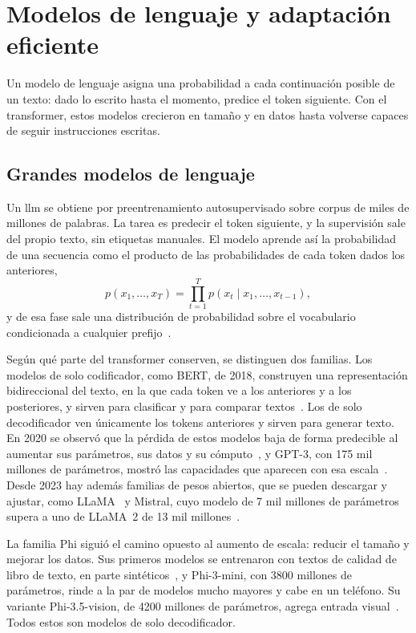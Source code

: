 \section{Modelos de lenguaje y adaptación eficiente}
\label{sec:marco_llm}

Un modelo de lenguaje asigna una probabilidad a cada continuación posible de un texto: dado lo escrito
hasta el momento, predice el token siguiente. Con el transformer, estos modelos crecieron en tamaño y en
datos hasta volverse capaces de seguir instrucciones escritas.

\subsection{Grandes modelos de lenguaje}
\label{sec:marco_llm_grandes}

Un \gls{llm} se obtiene por preentrenamiento autosupervisado sobre corpus de miles de millones de
palabras. La tarea es predecir el token siguiente, y la supervisión sale del propio texto, sin etiquetas
manuales. El modelo aprende así la probabilidad de una secuencia como el producto de las probabilidades de
cada token dados los anteriores,
\begin{equation}
    p(x_1, \dots, x_T) = \prod_{t=1}^{T} p(x_t \mid x_1, \dots, x_{t-1}),
    \label{eq:marco_lm}
\end{equation}
y de esa fase sale una distribución de probabilidad sobre el vocabulario condicionada a cualquier
prefijo~\cite{brown2020language,touvron2023llama}.

Según qué parte del transformer conserven, se distinguen dos familias. Los modelos de solo codificador,
como BERT, de 2018, construyen una representación bidireccional del texto, en la que cada token ve a los
anteriores y a los posteriores, y sirven para clasificar y para comparar textos~\cite{devlin2019bert}. Los de
solo decodificador ven únicamente los tokens anteriores y sirven para generar texto. En 2020 se observó que la
pérdida de estos modelos baja de forma predecible al aumentar sus parámetros, sus datos y su
cómputo~\cite{kaplan2020scaling}, y GPT-3, con 175 mil millones de parámetros, mostró las capacidades que
aparecen con esa escala~\cite{brown2020language}. Desde 2023 hay además familias de pesos abiertos, que se
pueden descargar y ajustar, como LLaMA~\cite{touvron2023llama} y Mistral, cuyo modelo de 7 mil millones de
parámetros supera a uno de LLaMA~2 de 13 mil millones~\cite{jiang2023mistral}.

La familia Phi siguió el camino opuesto al aumento de escala: reducir el tamaño y mejorar los datos. Sus
primeros modelos se entrenaron con textos de calidad de libro de texto, en parte
sintéticos~\cite{gunasekar2023textbooks}, y Phi-3-mini, con 3800 millones de parámetros, rinde a la par de
modelos mucho mayores y cabe en un teléfono. Su variante Phi-3.5-vision, de 4200 millones de parámetros,
agrega entrada visual~\cite{abdin2024phi3}. Todos estos son modelos de solo decodificador.


